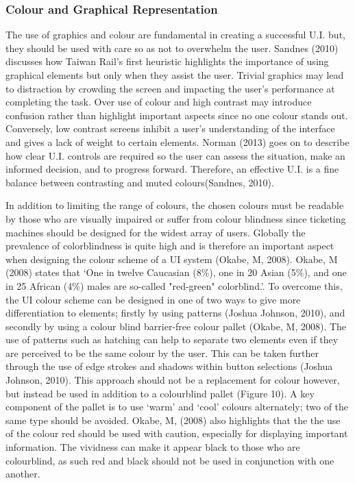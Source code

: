 \subsubsection{Colour and Graphical Representation}
The use of graphics and colour are fundamental in creating a successful U.I. but, they should be used with care so as not to overwhelm the user. Sandnes (2010) discusses how Taiwan Rail’s first heuristic highlights the importance of using graphical elements but only when they assist the user. Trivial graphics may lead to distraction by crowding the screen and impacting the user’s performance at completing the task. Over use of colour and high contrast may introduce confusion rather than highlight important aspects since no one colour stands out. Conversely, low contrast screens inhibit a user’s understanding of the interface and gives a lack of weight to certain elements.  Norman (2013) goes on to describe how clear U.I. controls are required so the user can assess the situation, make an informed decision, and to progress forward. Therefore, an effective U.I. is a fine balance between contrasting and muted colours(Sandnes, 2010). 

In addition to limiting the range of colours, the chosen colours must be readable by those who are visually impaired or suffer from colour blindness since ticketing machines should be designed for the widest array of users. Globally the prevalence of colorblindness is quite high and is therefore an important aspect when designing the colour scheme of a UI system (Okabe, M, 2008). Okabe, M (2008) states that ‘One in twelve Caucasian (8\%), one in 20 Asian (5\%), and one in 25 African (4\%) males are so-called "red-green" colorblind.’. To overcome this, the UI colour scheme can be designed in one of two ways to give more differentiation to elements; firstly by using patterns (Joshua Johnson, 2010), and secondly by using a colour blind barrier-free colour pallet (Okabe, M, 2008). The use of patterns such as hatching can help to separate two elements even if they are perceived to be the same colour by the user. This can be taken further through the use of edge strokes and shadows within button selections (Joshua Johnson, 2010). This approach should not be a replacement for colour however, but instead be used in addition to a colourblind pallet (Figure 10). A key component of the pallet is to use ‘warm’ and ‘cool’ colours alternately; two of the same type should be avoided. Okabe, M, (2008) also highlights that the the use of the colour red should be used with caution, especially for displaying important information. The vividness can make it appear black to those who are colourblind, as such red and black should not be used in conjunction with one another.

